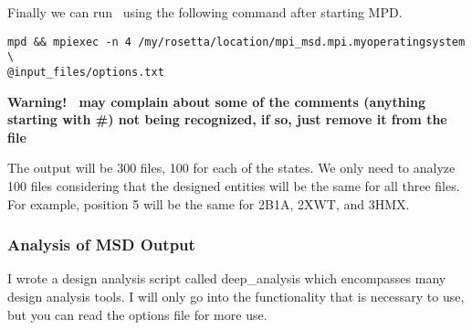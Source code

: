 Finally we can run \rosetta~using the following command after starting MPD.

\begin{lstlisting}[breaklines=true]
mpd && mpiexec -n 4 /my/rosetta/location/mpi_msd.mpi.myoperatingsystem \
@input_files/options.txt
\end{lstlisting}
\textbf{Warning! \linebreak \rosetta~may complain about some of the comments (anything starting with \#) not being recognized, if so, just remove it from the file}

The output will be 300 files, 100 for each of the states. We only need to analyze 100 files considering that the designed entities will be the same for all three files. For example, position 5 will be the same for 2B1A, 2XWT, and 3HMX.

\subsubsection{Analysis of MSD Output}
I wrote a design analysis script called deep\_analysis which encompasses many design analysis tools. I will only go into the functionality that is necessary to use, but you can read the options file for more use.

